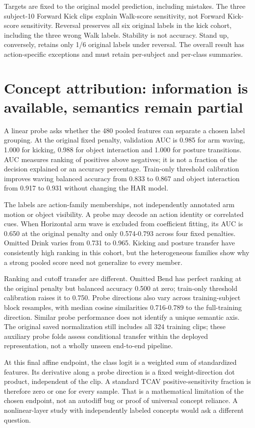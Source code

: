 \documentclass[11pt]{article}
\begin{document}
Targets are fixed to the original model prediction, including mistakes. The three subject-10 Forward Kick clips explain Walk-score sensitivity, not Forward Kick-score sensitivity. Reversal preserves all six original labels in the kick cohort, including the three wrong Walk labels. Stability is not accuracy. Stand up, conversely, retains only 1/6 original labels under reversal. The overall result has action-specific exceptions and must retain per-subject and per-class summaries.

\section{Concept attribution: information is available, semantics remain partial}
A linear probe asks whether the 480 pooled features can separate a chosen label grouping. At the original fixed penalty, validation AUC is 0.985 for arm waving, 1.000 for kicking, 0.988 for object interaction and 1.000 for posture transitions. AUC measures ranking of positives above negatives; it is not a fraction of the decision explained or an accuracy percentage. Train-only threshold calibration improves waving balanced accuracy from 0.833 to 0.867 and object interaction from 0.917 to 0.931 without changing the HAR model.

The labels are action-family memberships, not independently annotated arm motion or object visibility. A probe may decode an action identity or correlated cues. When Horizontal arm wave is excluded from coefficient fitting, its AUC is 0.650 at the original penalty and only 0.574-0.793 across four fixed penalties. Omitted Drink varies from 0.731 to 0.965. Kicking and posture transfer have consistently high ranking in this cohort, but the heterogeneous families show why a strong pooled score need not generalize to every member.

Ranking and cutoff transfer are different. Omitted Bend has perfect ranking at the original penalty but balanced accuracy 0.500 at zero; train-only threshold calibration raises it to 0.750. Probe directions also vary across training-subject block resamples, with median cosine similarities 0.716-0.789 to the full-training direction. Similar probe performance does not identify a unique semantic axis. The original saved normalization still includes all 324 training clips; these auxiliary probe folds assess conditional transfer within the deployed representation, not a wholly unseen end-to-end pipeline.

At this final affine endpoint, the class logit is a weighted sum of standardized features. Its derivative along a probe direction is a fixed weight-direction dot product, independent of the clip. A standard TCAV positive-sensitivity fraction is therefore zero or one for every sample. That is a mathematical limitation of the chosen endpoint, not an autodiff bug or proof of universal concept reliance. A nonlinear-layer study with independently labeled concepts would ask a different question.
\end{document}
